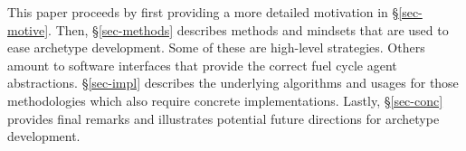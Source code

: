 This paper proceeds by first providing a more detailed motivation 
in \S \ref{sec-motive}. Then, \S \ref{sec-methods} describes 
methods and mindsets that are used to ease archetype development.
Some of these are high-level strategies. Others amount to 
software interfaces that 
provide the correct fuel cycle agent abstractions. 
\S \ref{sec-impl} describes the underlying algorithms and usages
for those methodologies which also require concrete implementations.
Lastly, \S \ref{sec-conc} provides final remarks and illustrates
potential future directions for \cyclus archetype development.
